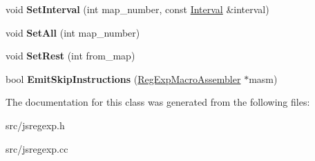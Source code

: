 \begin{DoxyCompactItemize}
\item 
\hypertarget{classv8_1_1internal_1_1_boyer_moore_lookahead_a10f6403132f37e64c3ea5b02e1476b1c}{}void {\bfseries Set\+Interval} (int map\+\_\+number, const \hyperlink{classv8_1_1internal_1_1_interval}{Interval} \&interval)\label{classv8_1_1internal_1_1_boyer_moore_lookahead_a10f6403132f37e64c3ea5b02e1476b1c}

\item 
\hypertarget{classv8_1_1internal_1_1_boyer_moore_lookahead_a36418e6a797298179b6386f16462b7d8}{}void {\bfseries Set\+All} (int map\+\_\+number)\label{classv8_1_1internal_1_1_boyer_moore_lookahead_a36418e6a797298179b6386f16462b7d8}

\item 
\hypertarget{classv8_1_1internal_1_1_boyer_moore_lookahead_aa0c55e2cb8b8bb1c6781fead233fb37f}{}void {\bfseries Set\+Rest} (int from\+\_\+map)\label{classv8_1_1internal_1_1_boyer_moore_lookahead_aa0c55e2cb8b8bb1c6781fead233fb37f}

\item 
\hypertarget{classv8_1_1internal_1_1_boyer_moore_lookahead_af1de2c6a1712a581af0bc816870a7728}{}bool {\bfseries Emit\+Skip\+Instructions} (\hyperlink{classv8_1_1internal_1_1_reg_exp_macro_assembler}{Reg\+Exp\+Macro\+Assembler} $\ast$masm)\label{classv8_1_1internal_1_1_boyer_moore_lookahead_af1de2c6a1712a581af0bc816870a7728}

\end{DoxyCompactItemize}


The documentation for this class was generated from the following files\+:\begin{DoxyCompactItemize}
\item 
src/jsregexp.\+h\item 
src/jsregexp.\+cc\end{DoxyCompactItemize}
